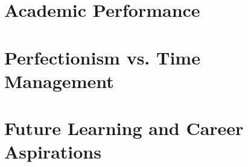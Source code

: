 \newpage
\section{Academic Performance}




\section{Perfectionism vs. Time Management}




\section{Future Learning and Career Aspirations}